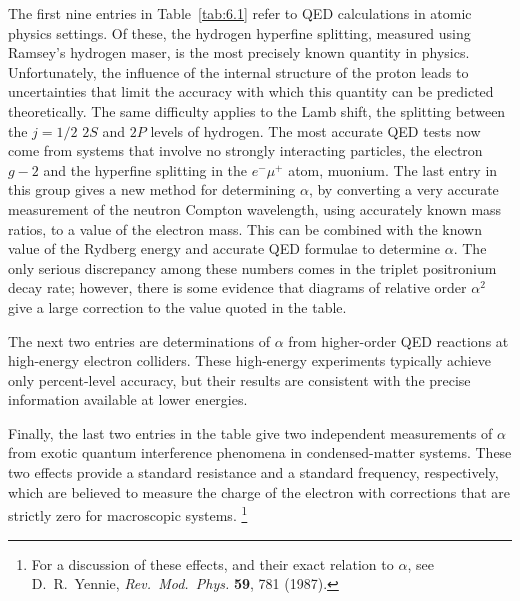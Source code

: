 The first nine entries in Table~\ref{tab:6.1} refer to QED calculations in
atomic physics settings.  Of these, the hydrogen hyperfine splitting, measured
using Ramsey's hydrogen maser, is the most precisely known quantity in
physics.  Unfortunately, the influence of the internal structure of the proton
leads to uncertainties that limit the accuracy with which this quantity can
be predicted theoretically.  The same difficulty applies to the Lamb shift,
the splitting between the $j = 1/2$ $2S$ and $2P$ levels of hydrogen.  The
most accurate QED tests now come from systems that involve no strongly
interacting particles, the electron $g-2$ and the hyperfine splitting in the
$e^{-}\mu^{+}$ atom, muonium.  The last entry in this group gives a new method
for determining $\alpha$, by converting a very accurate measurement of the
neutron Compton wavelength, using accurately known mass ratios, to a value of
the electron mass.  This can be combined with the known value of the Rydberg
energy and accurate QED formulae to determine $\alpha$.  The only serious
discrepancy among these numbers comes in the triplet positronium decay rate;
however, there is some evidence that diagrams of relative order $\alpha^2$
give a large correction to the value quoted in the table.

The next two entries are determinations of $\alpha$ from higher-order QED
reactions at high-energy electron colliders.  These high-energy experiments
typically achieve only percent-level accuracy, but their results are
consistent with the precise information available at lower energies.

Finally, the last two entries in the table give two independent measurements
of $\alpha$ from exotic quantum interference phenomena in condensed-matter
systems.  These two effects provide a standard resistance and a standard
frequency, respectively, which are believed to measure the charge of the
electron with corrections that are strictly zero for macroscopic systems.%
\footnote{For a discussion of these effects, and their exact relation to
$\alpha$, see D.~R.~Yennie, \emph{Rev.\ Mod.\ Phys.} \textbf{59}, 781 (1987).}

